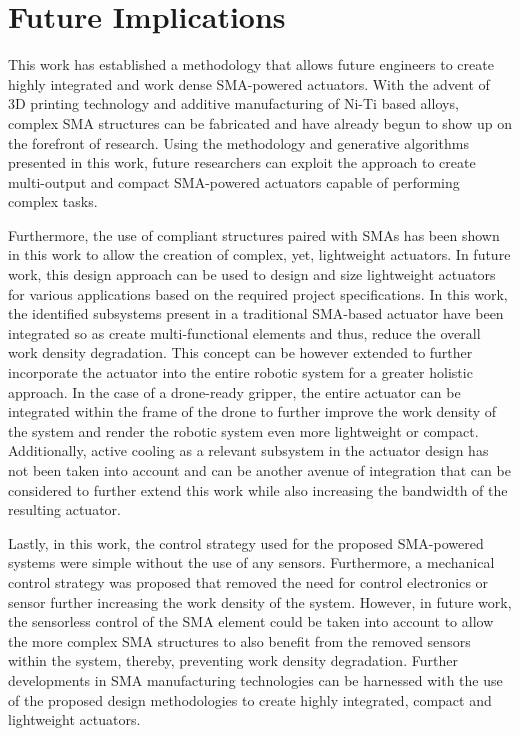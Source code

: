 \section*{Future Implications}
This work has established a methodology that allows future engineers to create highly integrated and work dense SMA-powered actuators. With the advent of 3D printing technology and additive manufacturing of Ni-Ti based alloys, complex SMA structures can be fabricated and have already begun to show up on the forefront of research. Using the methodology and generative algorithms presented in this work, future researchers can exploit the approach to create multi-output and compact SMA-powered actuators capable of performing complex tasks.

Furthermore, the use of compliant structures paired with SMAs has been shown in this work to allow the creation of complex, yet, lightweight actuators. In future work, this design approach can be used to design and size lightweight actuators for various applications based on the required project specifications. In this work, the identified subsystems present in a traditional SMA-based actuator have been integrated so as create multi-functional elements and thus, reduce the overall work density degradation. This concept can be however extended to further incorporate the actuator into the entire robotic system for a greater holistic approach. In the case of a drone-ready gripper, the entire actuator can be integrated within the frame of the drone to further improve the work density of the system and render the robotic system even more lightweight or compact. Additionally, active cooling as a relevant subsystem in the actuator design has not been taken into account and can be another avenue of integration that can be considered to further extend this work while also increasing the bandwidth of the resulting actuator.

Lastly, in this work, the control strategy used for the proposed SMA-powered systems were simple without the use of any sensors. Furthermore, a mechanical control strategy was proposed that removed the need for control electronics or sensor further increasing the work density of the system. However, in future work, the sensorless control of the SMA element could be taken into account to allow the more complex SMA structures to also benefit from the removed sensors within the system, thereby, preventing work density degradation. Further developments in SMA manufacturing technologies can be harnessed with the use of the proposed design methodologies to create highly integrated, compact and lightweight actuators.
